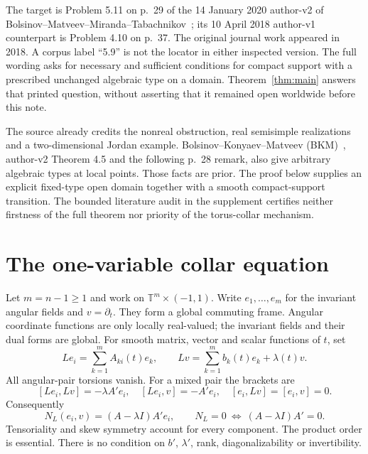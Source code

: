 \documentclass[11pt]{article}
\newcommand{\T}{\mathbb T}
\begin{document}
The target is Problem 5.11 on p.~29 of the 14 January 2020 author-v2
of Bolsinov--Matveev--Miranda--Tabachnikov~\cite{problems}; its 10 April
2018 author-v1 counterpart is Problem 4.10 on p.~37. The original journal
work appeared in 2018. A corpus label ``5.9'' is not the locator in either
inspected version. The full wording asks for necessary and sufficient
conditions for compact support with a prescribed unchanged algebraic type
on a domain. Theorem~\ref{thm:main} answers that printed question, without
asserting that it remained open worldwide before this note.

The source already credits the nonreal obstruction, real semisimple
realizations and a two-dimensional Jordan example. Bolsinov--Konyaev--Matveev
(BKM)~\cite{bkm}, author-v2 Theorem 4.5 and the following p.~28 remark,
also give arbitrary algebraic types at local points. Those facts are prior.
The proof below supplies an explicit fixed-type open domain together with
a smooth compact-support transition. The bounded literature audit in the
supplement certifies neither firstness of the full theorem nor priority of
the torus-collar mechanism.

\section{The one-variable collar equation}
Let $m=n-1\geq1$ and work on $\T^m\times(-1,1)$. Write
$e_1,\ldots,e_m$ for the invariant angular fields and $v=\partial_t$.
They form a global commuting frame. Angular coordinate functions are only
locally real-valued; the invariant fields and their dual forms are global.
For smooth matrix, vector and scalar functions of $t$, set
\[
 Le_i=\sum_{k=1}^m A_{ki}(t)e_k,\qquad
 Lv=\sum_{k=1}^m b_k(t)e_k+\lambda(t)v.
\]
All angular-pair torsions vanish. For a mixed pair the brackets are
\[
 [Le_i,Lv]=-\lambda A'e_i,\quad [Le_i,v]=-A'e_i,
 \quad [e_i,Lv]=[e_i,v]=0.
\]
Consequently
\begin{equation}\label{eq:collar}
 N_L(e_i,v)=(A-\lambda I)A'e_i,\qquad
 N_L=0\ \Longleftrightarrow\ (A-\lambda I)A'=0.
\end{equation}
Tensoriality and skew symmetry account for every component. The product
order is essential. There is no condition on $b'$, $\lambda'$, rank,
diagonalizability or invertibility.
\end{document}
